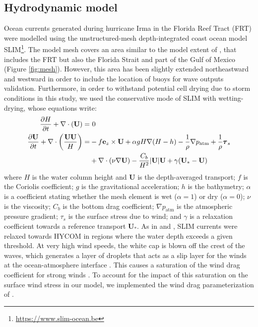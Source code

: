 \documentclass[11pt,a4paper]{article}
\newcommand{\UV}{\mathbf{U}}
\begin{document}
\subsection{Hydrodynamic model}
Ocean currents generated during hurricane Irma in the Florida Reef Tract (FRT) were modelled using the unstructured-mesh depth-integrated coast ocean model SLIM\footnote{\url{https://www.slim-ocean.be}}. The model mesh covers an area similar to the model extent of \cite{dobbelaere2020coupled}, that includes the FRT but also the Florida Strait and part of the Gulf of Mexico (Figure \ref{fig:mesh}). However, this area has been slightly extended northeastward and westward in order to include the location of buoys for wave outputs validation. Furthermore, in order to withstand potential cell drying due to storm conditions in this study, we used the conservative mode of SLIM with wetting-drying, whose equations write:
\begin{equation}
    \begin{split}
        \dfrac{\partial H}{\partial t} +\nabla\cdot(\UV) =& ~0 \\
        \dfrac{\partial \UV}{\partial t}  + \nabla\cdot\left(\dfrac{\UV\UV}{H}\right) =& -f\mathbf{e}_z \times \UV + \alpha gH\nabla(H-h) - \dfrac{1}{\rho}\nabla p_\text{atm} + \dfrac{1}{\rho}\text{\boldmath$\tau$}_s \\
         &+\nabla\cdot(\nu\nabla\UV) - \dfrac{C_b}{H^2}|\UV|\UV + \gamma(\UV_\ast-\UV)
    \end{split}
\end{equation}
where $H$ is the water column height and $\UV$ is the depth-averaged transport; $f$ is the Coriolis coefficient; $g$ is the gravitational acceleration; $h$ is the bathymetry; $\alpha$ is a coefficient stating whether the mesh element is wet ($\alpha=1$) or dry ($\alpha=0$); $\nu$  is the viscosity; $C_b$ is the bottom drag coefficient; $\nabla p_\text{atm}$ is the atmospheric pressure gradient; {\boldmath$\tau$}$_s$ is the surface stress due to wind; and $\gamma$ is a relaxation coefficient towards a reference transport $\UV_\ast$. As in \cite{frys2020fine} and \cite{dobbelaere2020coupled}, SLIM currents were relaxed towards HYCOM \citep{chassignet2007hycom} in regions where the water depth exceeds a given threshold. At very high wind speeds, the white cap is blown off the crest of the waves, which generates a layer of droplets that acts as a slip layer for the winds at the ocean-atmosphere interface \citep{holthuijsen2012wind}. This causes a saturation of the wind drag coefficient for strong winds \citep{donelan2004limiting,powell2003reduced}. To account for the impact of this saturation on the surface wind stress in our model, we implemented the wind drag parameterization of \cite{moon2007physics}.
\end{document}
